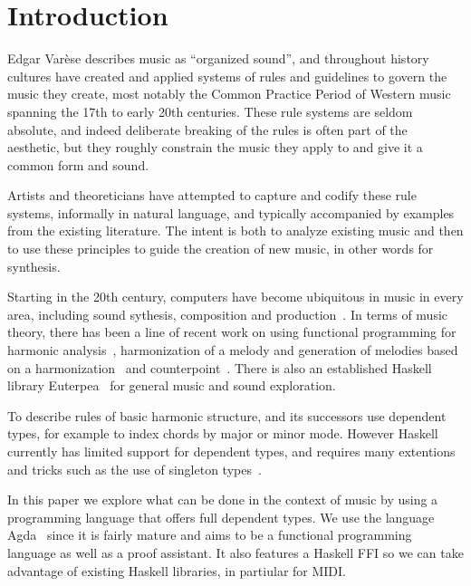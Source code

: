 \section{Introduction}
\label{sec:intro}

Edgar Var\`{e}se describes music as ``organized sound'', and
throughout history cultures have created and applied systems of rules
and guidelines to govern the music they create, most notably the
Common Practice Period of Western music spanning the 17th to early
20th centuries. These rule systems are seldom absolute, and indeed
deliberate breaking of the rules is often part of the aesthetic, but they
roughly constrain the music they apply to and
give it a common form and sound.

Artists and theoreticians have attempted to capture and codify these
rule systems, informally in natural language, and typically
accompanied by examples from the existing literature. The intent is
both to analyze existing music and then to use these principles to
guide the creation of new music, in other words for synthesis.

Starting in the 20th century, computers have become ubiquitous in
music in every area, including sound sythesis, composition and
production~\citep{roads-tutorial}. In terms of music theory, there has
been a line of recent work on using functional programming for
harmonic
analysis~\citep{magalhaes-harmtrace,dehaas-harmtrace-a,dehaas-harmtrace-b},
harmonization of a melody and generation of melodies based on a
harmonization~\citep{koops-fharm,magalhaes-fcomp} and
counterpoint~\citep{szamozvancev-welltyped}. There is also an
established Haskell library Euterpea~\citep{hudak-haskell} for general music
and sound exploration.

To describe rules of basic harmonic structure,
\citet{magalhaes-harmtrace} and its successors use dependent types,
for example to index chords by major or minor mode.  However Haskell
currently has limited support for dependent types, and requires many
extentions and tricks such as the use of singleton
types~\citep{eisenberg-singleton}.

In this paper we explore what can be done in the context of music by
using a programming language that offers full dependent types. We use
the language Agda~\citep{norell-phd} since it is fairly mature and
aims to be a functional programming language as well as a proof
assistant. It also features a Haskell FFI so we can take advantage of
existing Haskell libraries, in partiular for MIDI.

